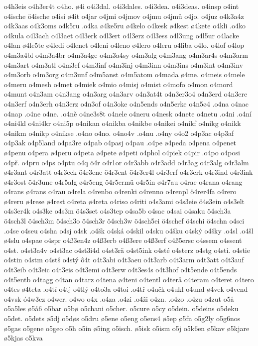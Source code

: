 {{o4h3eis
o4h3er4t
o4ho.
ø4i
o4i3dal.
o4i3dales.
o4i3dea.
o4i3deas.
o4insp
o4int
o4ische
ö4ische
o4isi
ø4it
o4jar
o4jmi
o4jmov
o4jmu
o4jmů
o4jo.
o4juz
o4k3a4z
o4k3aas
o4k3oms
o4k5ru
.o4ka
ø4ke5ru
ø4kelo
o4kesk
ø4kest
ø4kete
o4kli
.o4ko
o4kula
o4l3ach
o4l3aet
o4l3erk
o4l3ert
o4l3erz
o4l3ess
o4l3ung
o4l5ur
o4lacke
o4lan
ø4le5te
ø4ledi
o4lenet
o4leni
o4leno
ø4lero
o4leru
o4liba
o4lo.
o4lof
o4lop
o4m3a4bl
o4m3a4br
o4m3a4ge
o4m3a4sy
o4m3alg
o4m3ang
o4m3ar4s
o4m3arm
o4m3art
o4m3atl
o4m3ef
o4m3inf
o4m3inj
o4m3inn
o4m3ins
o4m3int
o4m3inv
o4m3orb
o4m3org
o4m3unf
o4m5anst
o4m5atom
o4mada
ø4me.
o4meis
o4mele
o4meru
o4mesh
o4met
o4miek
o4mio
o4misj
o4mist
o4mofo
o4mon
o4mord
o4munt
o4n3am
o4n3ang
o4n3arg
o4n3arv
o4n3at4t
o4n3er3o4
o4n3erd
o4n3ere
o4n3erf
o4n3erh
o4n3erz
o4n3of
o4n3oke
o4n5ends
o4n5erke
o4n5ø4
.o4na
o4nac
o4nap
.o4ne
o4ne.
.o4ně
o4ne3s8t
o4nele
o4neru
o4nesk
o4nete
o4netu
.o4ni
.o4ní
o4ni4kl
o4ni4kr
o4ni5p
o4nikan
o4nikba
o4nikbe
o4nikei
o4nikf
o4nikg
o4nikk
o4nikm
o4nikp
o4nikse
.o4no
o4no.
o4no4v
.o4nu
.o4ny
o4o2
o4p3ac
o4p3af
o4p3ak
o4p5land
o4pa3re
o4pab
o4pasj
o4pau
.o4pe
ø4peda
o4pena
o4penet
ø4penu
o4pera
ø4peru
o4peta
ø4pete
ø4peti
o4phol
o4piek
o4pir
.o4po
o4posi
o4př.
o4pru
o4ps
o4ptu
o4q
ö4r
o4r1or
o4r3abb
o4r3add
o4r3ag
o4r3alg
o4r3alm
ø4r3ant
o4r3att
o4r3eck
ö4r3ene
ö4r3ent
ö4r3er4l
o4r3erf
o4r3erk
o4r3ind
o4r3ink
ø4r3ost
ö4r3une
o4r5alg
ø4r5eng
ö4r5ermü
o4r5in
ø4r7au
o4rae
o4rana
o4rang
o4rans
ø4rans
o4rau
o4rela
o4renbo
o4renki
o4renno
o4renpl
ö4rer4fa
o4rero
ø4reru
ø4rese
ø4rest
o4reta
ø4reta
o4riso
o4riti
o4s3ami
o4s3eie
ö4s3ein
o4s3elt
o4s3er4k
o4s3ke
o4s3m
ö4s3set
o4s3tep
o4sa5b
o4sac
o4sai
o4saku
ö4sch3a
ö4sch3l
ö4sch3m
ö4sch3o
ö4sch3r
ö4sch3w
ö4sch5ei
ö4schef
ö4schi
ö4schn
o4sci
.o4se
o4seu
o4sha
o4sj
o4sk
.o4šk
o4ská
o4skil
o4sku
o4šku
o4ský
o4šky
.o4sl
.o4šl
ø4slu
o4spae
o4spr
o4ß3en4z
o4ß3erb
o4ß3ere
o4ß3erf
o4ß5ersc
o4ssem
o4ssent
o4st.
o4st3a4v
o4st3ac
o4st3i4d
o4st3rä
o4st5ink
o4sté
o4sterz
o4stg
o4sti.
o4stie
o4stin
o4stm
o4stš
o4stý
ô4t
o4t3abi
o4t3aeu
o4t3arb
o4t3arm
o4t3att
o4t3auf
o4t3eib
o4t3eic
o4t3eis
o4t3emi
o4t3erw
o4t3es4s
o4t3hof
o4t5ende
o4t5ends
o4t5entb
o4tagg
o4tan
o4tarz
o4tena
ø4teni
o4tentl
o4terå
o4teram
o4teret
o4tero
o4tes
ø4teta
.o4tí
o4tj
o4tlý
o4to3a
o4toi
.o4tř
o4učk
o4ukl
o4und
ø4vek
o4vend
o4vsk
ó4w3cz
o4wer.
o4wo
o4x
.o4za
.o4zi
.o4ži
o4zn.
.o4zo
.o4zu
o4zut
o5å
o5a5les
ø5å6
o5bar
o5bø
o5chani
o5cher.
o5cure
o5cy
o5dein.
o5deins
o5deku
o5det.
o5dets
ø5dj
o5døs
o5dru
ø5ene
o5eng
o5ens4
ø5ep
ø5fn
o5g2ly
o5g6nos
ø5gas
o5gene
o5geo
o5h
o5in
ø5ing
o5isch.
ø5isk
o5ism
o5j
o5k6en
ø5kav
ø5kjare
ø5kjas
o5kva
}}
